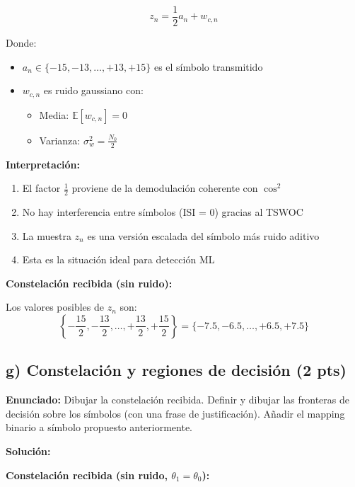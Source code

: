 \documentclass[11pt,a4paper]{article}
\begin{document}
\[
\boxed{z_n = \frac{1}{2} a_n + w_{c,n}}
\]

Donde:
\begin{itemize}
    \item $a_n \in \{-15, -13, \ldots, +13, +15\}$ es el s\'imbolo transmitido
    \item $w_{c,n}$ es ruido gaussiano con:
    \begin{itemize}
        \item Media: $\mathbb{E}[w_{c,n}] = 0$
        \item Varianza: $\sigma_w^2 = \frac{N_0}{2}$
    \end{itemize}
\end{itemize}

\textbf{Interpretaci\'on:}

\begin{enumerate}
    \item El factor $\frac{1}{2}$ proviene de la demodulaci\'on coherente con $\cos^2$
    
    \item No hay interferencia entre s\'imbolos (ISI = 0) gracias al TSWOC
    
    \item La muestra $z_n$ es una versi\'on escalada del s\'imbolo m\'as ruido aditivo
    
    \item Esta es la situaci\'on ideal para detecci\'on ML
\end{enumerate}

\textbf{Constelaci\'on recibida (sin ruido):}

Los valores posibles de $z_n$ son:
\[
\left\{-\frac{15}{2}, -\frac{13}{2}, \ldots, +\frac{13}{2}, +\frac{15}{2}\right\} = \{-7.5, -6.5, \ldots, +6.5, +7.5\}
\]



\subsection*{g) Constelaci\'on y regiones de decisi\'on (2 pts)}

\textbf{Enunciado:} Dibujar la constelaci\'on recibida. Definir y dibujar las fronteras de decisi\'on sobre los s\'imbolos (con una frase de justificaci\'on). A\~nadir el mapping binario a s\'imbolo propuesto anteriormente.

\vspace{0.3cm}
\textbf{Soluci\'on:}

\textbf{Constelaci\'on recibida (sin ruido, $\theta_1 = \theta_0$):}
\end{document}
